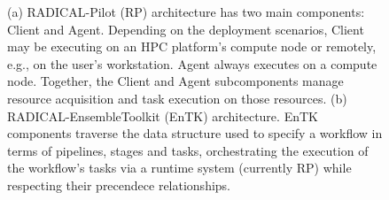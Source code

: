 \documentclass[preprint,12pt, a4paper]{elsarticle}
\begin{document}
\begin{figure}
    \centering
    \qquad
    \caption{(a) RADICAL-Pilot (RP) architecture has two main components: Client
    and Agent. Depending on the deployment scenarios, Client may be executing on
    an HPC platform's compute node or remotely, e.g., on the user's workstation.
    Agent always executes on a compute node. Together, the Client and Agent
    subcomponents manage resource acquisition and task execution on those
    resources. (b) RADICAL-EnsembleToolkit (EnTK) architecture. EnTK components
    traverse the data structure used to specify a workflow in terms of
    pipelines, stages and tasks, orchestrating the execution of the workflow's
    tasks via a runtime system (currently RP) while respecting their precendece
    relationships.}\label{fig:archs}
\end{figure}

\end{document}
